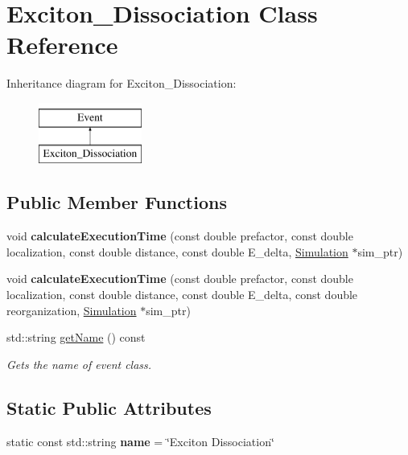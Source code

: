 \hypertarget{class_exciton___dissociation}{}\section{Exciton\+\_\+\+Dissociation Class Reference}
\label{class_exciton___dissociation}
Inheritance diagram for Exciton\+\_\+\+Dissociation\+:\begin{figure}[H]
\begin{center}
\leavevmode
\includegraphics[height=2.000000cm]{class_exciton___dissociation}
\end{center}
\end{figure}
\subsection*{Public Member Functions}
\begin{DoxyCompactItemize}
\item 
\mbox{\label{class_exciton___dissociation_a2da846b02c20a7c070567de92762d53b}} 
void {\bfseries calculate\+Execution\+Time} (const double prefactor, const double localization, const double distance, const double E\+\_\+delta, \hyperlink{class_simulation}{Simulation} $\ast$sim\+\_\+ptr)
\item 
\mbox{\label{class_exciton___dissociation_a8637e01b4532ba5442ded098883b64a0}} 
void {\bfseries calculate\+Execution\+Time} (const double prefactor, const double localization, const double distance, const double E\+\_\+delta, const double reorganization, \hyperlink{class_simulation}{Simulation} $\ast$sim\+\_\+ptr)
\item 
std\+::string \hyperlink{class_exciton___dissociation_a1cfdbcfa3930666e0fddea28cc18ac9e}{get\+Name} () const
\begin{DoxyCompactList}\small\item\em Gets the name of event class. \end{DoxyCompactList}\end{DoxyCompactItemize}
\subsection*{Static Public Attributes}
\begin{DoxyCompactItemize}
\item 
\mbox{\label{class_exciton___dissociation_a16a06165fe1c2468850b2d05243b24cd}} 
static const std\+::string {\bfseries name} = \char`\"{}Exciton Dissociation\char`\"{}
\end{DoxyCompactItemize}


